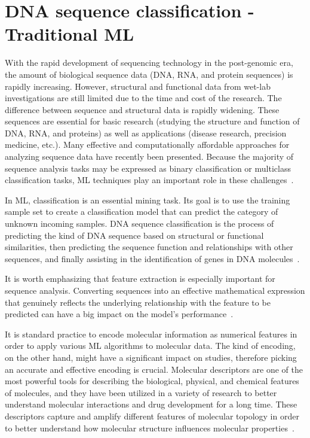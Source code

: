 \section{DNA sequence classification - Traditional ML}

With the rapid development of sequencing technology in the post-genomic era, the amount of biological sequence data (\gls{DNA}, \gls{RNA}, and protein sequences) is rapidly increasing. However, structural and functional data from wet-lab investigations are still limited due to the time and cost of the research. The difference between sequence and structural data is rapidly widening. These sequences are essential for basic research (studying the structure and function of \gls{DNA}, \gls{RNA}, and proteins) as well as applications (disease research, precision medicine, etc.). Many effective and computationally affordable approaches for analyzing sequence data have recently been presented. Because the majority of sequence analysis tasks may be expressed as binary classification or multiclass classification tasks, \gls{ML} techniques play an important role in these challenges~\cite{Liu2019BioSeq-Analysis:Approaches}.

In \gls{ML}, classification is an essential mining task. Its goal is to use the training sample set to create a classification model that can predict the category of unknown incoming samples. \gls{DNA} sequence classification is the process of predicting the kind of \gls{DNA} sequence based on structural or functional similarities, then predicting the sequence function and relationships with other sequences, and finally assisting in the identification of genes in \gls{DNA} molecules~\cite{Yang2020ReviewDNA}.

It is worth emphasizing that feature extraction is especially important for sequence analysis. Converting sequences into an effective mathematical expression that genuinely reflects the underlying relationship with the feature to be predicted can have a big impact on the model's performance~\cite{Chen2020ILearn:Data}.

It is standard practice to encode molecular information as numerical features in order to apply various \gls{ML} algorithms to molecular data. The kind of encoding, on the other hand, might have a significant impact on studies, therefore picking an accurate and effective encoding is crucial. Molecular descriptors are one of the most powerful tools for describing the biological, physical, and chemical features of molecules, and they have been utilized in a variety of research to better understand molecular interactions and drug development for a long time. These descriptors capture and amplify different features of molecular topology in order to better understand how molecular structure influences molecular properties~\cite{Dong2018PyBioMed:Interactions}.

